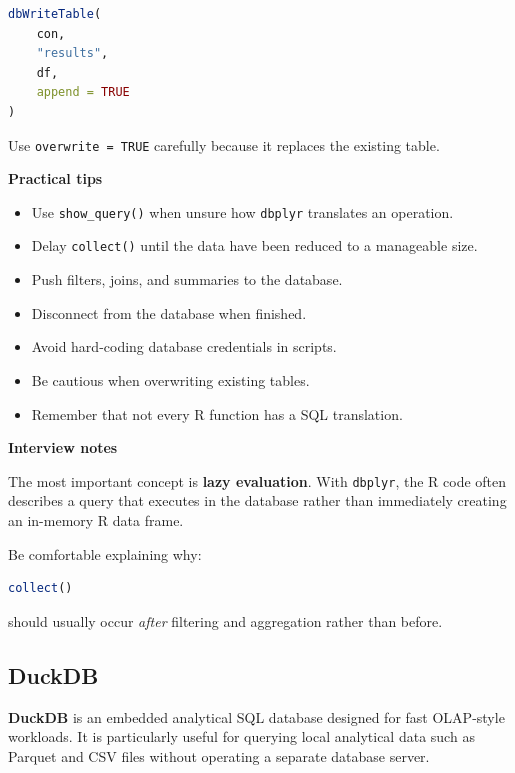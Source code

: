 \documentclass[11pt,letterpaper]{article}
\begin{document}
\begin{lstlisting}[language=R]
dbWriteTable(
    con,
    "results",
    df,
    append = TRUE
)
\end{lstlisting}

Use \texttt{overwrite = TRUE} carefully because it replaces the existing
table.

\textbf{Practical tips}

\begin{itemize}[leftmargin=*]
    \item Use \texttt{show\_query()} when unsure how \texttt{dbplyr} translates an
    operation.
    \item Delay \texttt{collect()} until the data have been reduced to a manageable
    size.
    \item Push filters, joins, and summaries to the database.
    \item Disconnect from the database when finished.
    \item Avoid hard-coding database credentials in scripts.
    \item Be cautious when overwriting existing tables.
    \item Remember that not every R function has a SQL translation.
\end{itemize}

\textbf{Interview notes}

The most important concept is \textbf{lazy evaluation}. With
\texttt{dbplyr}, the R code often describes a query that executes in the
database rather than immediately creating an in-memory R data frame.

Be comfortable explaining why:

\begin{lstlisting}[language=R]
collect()
\end{lstlisting}

should usually occur \emph{after} filtering and aggregation rather than before.



\subsection{DuckDB}

\textbf{DuckDB} is an embedded analytical SQL database designed for fast
OLAP-style workloads. It is particularly useful for querying local analytical
data such as Parquet and CSV files without operating a separate database
server.
\end{document}
